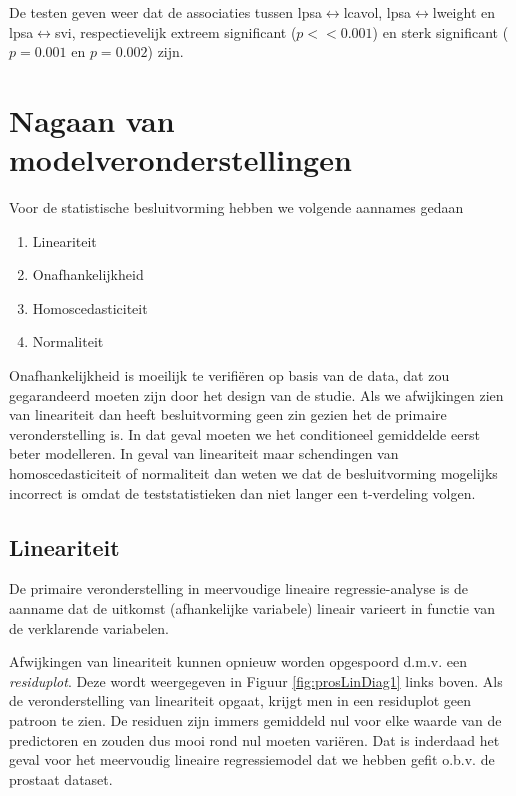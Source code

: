 \documentclass[
  12pt,dutch,coursenotes]{book}
\providecommand{\tightlist}{%
  \setlength{\itemsep}{0pt}\setlength{\parskip}{0pt}}
\theoremstyle{definition}
\theoremstyle{definition}
\theoremstyle{definition}
\theoremstyle{remark}
\begin{document}
De testen geven weer dat de associaties tussen lpsa\(\leftrightarrow\)lcavol, lpsa\(\leftrightarrow\)lweight en lpsa\(\leftrightarrow\)svi, respectievelijk extreem significant (\(p << 0.001\)) en sterk significant (\(p=0.001\) en \(p=0.002\)) zijn.

\hypertarget{nagaan-van-modelveronderstellingen-1}{%
\section{Nagaan van modelveronderstellingen}\label{nagaan-van-modelveronderstellingen-1}}

Voor de statistische besluitvorming hebben we volgende aannames gedaan

\begin{enumerate}
\def\labelenumi{\arabic{enumi}.}
\tightlist
\item
  Lineariteit
\item
  Onafhankelijkheid\\
\item
  Homoscedasticiteit
\item
  Normaliteit
\end{enumerate}

Onafhankelijkheid is moeilijk te verifiëren op basis van de data, dat zou gegarandeerd moeten zijn door het design van de studie.
Als we afwijkingen zien van lineariteit dan heeft besluitvorming geen zin gezien het de primaire veronderstelling is.
In dat geval moeten we het conditioneel gemiddelde eerst beter modelleren.
In geval van lineariteit maar schendingen van homoscedasticiteit of normaliteit dan weten we dat de besluitvorming mogelijks incorrect is omdat de teststatistieken dan niet langer een t-verdeling volgen.

\hypertarget{lineariteit-1}{%
\subsection{Lineariteit}\label{lineariteit-1}}

De primaire veronderstelling in meervoudige lineaire regressie-analyse is de aanname dat de uitkomst (afhankelijke variabele) lineair varieert in functie van de verklarende variabelen.

Afwijkingen van lineariteit kunnen opnieuw worden opgespoord d.m.v. een \emph{residuplot}. Deze wordt weergegeven in Figuur \ref{fig:prosLinDiag1} links boven. Als de veronderstelling van lineariteit opgaat, krijgt men in een residuplot geen patroon te zien.
De residuen zijn immers gemiddeld nul voor elke waarde van de predictoren en zouden dus mooi rond nul moeten variëren.
Dat is inderdaad het geval voor het meervoudig lineaire regressiemodel dat we hebben gefit o.b.v. de prostaat dataset.
\end{document}
